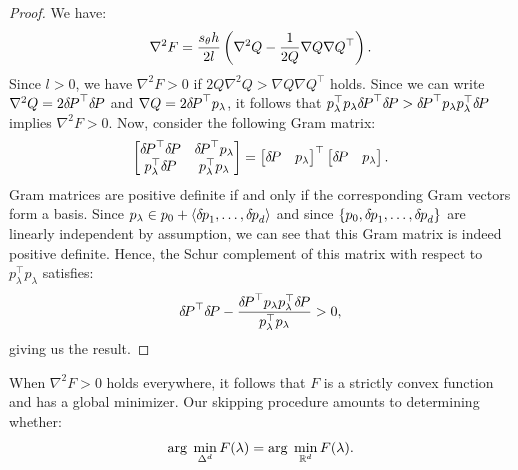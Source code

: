\documentclass[eikonal.tex]{subfiles}
\begin{document}
\begin{proof}
  We have:
  \begin{align*}
    \nabla^2 F = \frac{s_\theta h}{2l} \left(\nabla^2 Q - \frac{1}{2 Q} \nabla Q \nabla Q^\top\right).
  \end{align*}
  Since $l > 0$, we have $\nabla^2 F > 0$ if
  $2 Q \nabla^2 Q > \nabla Q \nabla Q^\top$ holds. Since we can write
  $\nabla^2 Q = 2 {\delta \hspace{-0.14em} P}^\top {\delta \hspace{-0.14em} P}$ and
  $\nabla Q = 2 {\delta \hspace{-0.14em} P}^\top p_\lambda$, it follows that
  $p_\lambda^\top p_\lambda {\delta \hspace{-0.14em} P}^\top {\delta \hspace{-0.14em} P} > {\delta \hspace{-0.14em} P}^\top
  p_\lambda p_\lambda^\top {\delta \hspace{-0.14em} P}$ implies $\nabla^2 F > 0$. Now,
  consider the following Gram matrix:
  \begin{align*}
    \begin{bmatrix}
      {\delta \hspace{-0.14em} P}^\top {\delta \hspace{-0.14em} P} & {\delta \hspace{-0.14em} P}^\top p_\lambda \\
      p_\lambda^\top {\delta \hspace{-0.14em} P} & p_\lambda^\top p_\lambda
    \end{bmatrix} = \begin{bmatrix}
      {\delta \hspace{-0.14em} P} & p_\lambda
    \end{bmatrix}^\top \begin{bmatrix}
      {\delta \hspace{-0.14em} P} & p_\lambda
    \end{bmatrix}.
  \end{align*}
  Gram matrices are positive definite if and only if the corresponding
  Gram vectors form a basis. Since
  $p_\lambda \in p_0 + \langle {\delta \hspace{-0.08em} p}_1, \hdots, {\delta \hspace{-0.08em} p}_d \rangle$
  and since $\left\{p_0, {\delta \hspace{-0.08em} p}_1, \hdots, {\delta \hspace{-0.08em} p}_d\right\}$ are linearly
  independent by assumption, we can see that this Gram matrix is
  indeed positive definite. Hence, the Schur complement of this matrix
  with respect to $p_\lambda^\top p_\lambda$ satisfies:
  \begin{align*}
    {\delta \hspace{-0.14em} P}^\top {\delta \hspace{-0.14em} P} - \frac{{\delta \hspace{-0.14em} P}^\top p_\lambda p_\lambda^\top {\delta \hspace{-0.14em} P}}{p_\lambda^\top p_\lambda} > 0,
  \end{align*}
  giving us the result.
\end{proof}

\begin{remark}
  When $\nabla^2 F > 0$ holds everywhere, it follows that $F$ is a
  strictly convex function and has a global minimizer. Our skipping
  procedure amounts to determining whether:
  \begin{align}\label{eq:minimizers-are-the-same}
    \operatorname{arg}\;\min_{\Delta^d} F(\lambda) = \operatorname{arg}\;\min_{\mathbb{R}^d} F(\lambda).
  \end{align}
\end{remark}
\end{document}
